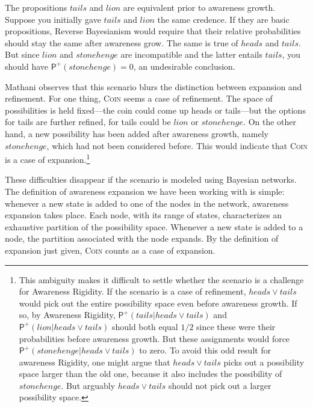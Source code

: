 \documentclass[
  11pt,
  dvipsnames,enabledeprecatedfontcommands, todos]{scrartcl}
\newcommand{\ppr}[2]{\ensuremath{\mathsf{P}^{#1}(#2)}}
\begin{document}
\doublespace

\noindent  The propositions \(tails\) and \(lion\) are equivalent prior
to awareness growth. Suppose you initially gave \(tails\) and \(lion\)
the same credence. If they are basic propositions, Reverse Bayesianism
would require that their relative probabilities should stay the same
after awareness grow. The same is true of \(heads\) and \(tails\). But
since \(lion\) and \(stonehenge\) are incompatible and the latter
entails \(tails\), you should have \(\ppr{+}{stonehenge} = 0\), an
undesirable conclusion.

Mathani observes that this scenario blurs the distinction between
expansion and refinement. For one thing, \textsc{Coin} seems a case of
refinement. The space of possibilities is held fixed---the coin could
come up heads or tails---but the options for tails are further refined,
for tails could be \(lion\) or \(stonehenge\). On the other hand, a new
possibility has been added after awareness growth, namely
\(stonehenge\), which had not been considered before. This would
indicate that \textsc{Coin} is a case of expansion.\footnote{This
  ambiguity makes it difficult to settle whether the scenario is a
  challenge for Awareness Rigidity. If the scenario is a case of
  refinement, \(heads \vee tails\) would pick out the entire possibility
  space even before awareness growth. If so, by Awareness Rigidity,
  \(\ppr{+}{tails \vert heads \vee tails}\) and
  \(\ppr{+}{lion \vert heads \vee tails}\) should both equal \(1/2\)
  since these were their probabilities before awareness growth. But
  these assignments would force
  \(\ppr{+}{stonehenge \vert heads \vee tails}\) to zero. To avoid this
  odd result for awareness Rigidity, one might argue that
  \(heads \vee tails\) picks out a possibility space larger than the old
  one, because it also includes the possibility of \(stonehenge\). But
  arguably \(heads \vee tails\) should not pick out a larger possibility
  space.}

These difficulties disappear if the scenario is modeled using Bayesian
networks. The definition of awareness expansion we have been working
with is simple: whenever a new state is added to one of the nodes in the
network, awareness expansion takes place. Each node, with its range of
states, characterizes an exhaustive partition of the possibility space.
Whenever a new state is added to a node, the partition associated with
the node expands. By the definition of expansion just given,
\textsc{Coin} counts as a case of expansion.
\end{document}
